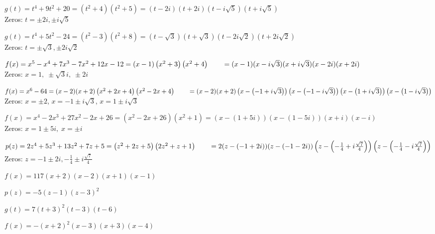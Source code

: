 \begin{exenum}
\item  $g(t) = t^4+9t^2+20 = \left(t^2+4\right) \left(t^2+5\right) = (t-2i)(t+2i)\left(t - i \sqrt{5}\right)\left(t + i \sqrt{5}\right)$\\
Zeros:  $t = \pm 2i, \pm i \sqrt{5}$
\item  $g(t) = t^4+5t^2-24 = \left(t^2-3 \right) \left(t^2+8\right) = (t-\sqrt{3})(t+\sqrt{3})\left(t - 2i \sqrt{2}\right)\left(t + 2i \sqrt{2}\right)$\\
Zeros:  $t = \pm \sqrt{3}, \pm 2i \sqrt{2}$

\item  $f(x) = x^5 - x^4+7x^3-7x^2+12x-12 = (x-1) \left(x^2 + 3\right) \left(x^2 + 4 \right) \\
\phantom{f(x)} = (x-1)(x - i \sqrt{3})(x + i \sqrt{3})(x-2i)(x+2i)$ \\
Zeros:  $x = 1, \;  \pm  \sqrt{3}i,  \; \pm 2i$
\item $f(x) = x^6 - 64 = (x-2)(x+2)\left(x^2+2x+4\right)\left(x^2-2x+4\right) \\
      \phantom{f(x)} = (x-2)(x+2)\left( x - \left( -1+i\sqrt{3} \right) \right)\left( x - \left( -1-i\sqrt{3} \right) \right)\left( x - \left( 1+i\sqrt{3} \right) \right)\left( x - \left( 1-i\sqrt{3} \right) \right)$ \\
Zeros:  $x = \pm 2$, $x = -1 \pm i\sqrt{3}$, $x = 1 \pm i\sqrt{3}$


\item $f(x) = x^{4} - 2x^{3} + 27x^{2} - 2x + 26 = (x^{2} - 2x + 26)(x^{2} + 1) = (x - (1 + 5i))(x - (1 - 5i))(x + i)(x - i)$\\ 
Zeros: $x = 1 \pm 5i, \; x = \pm i$
\item  $p(z) = 2z^4+5z^3+13z^2+7z+5 = \left(z^2+2z+5\right) \left(2z^2+z+1\right)  \\ \phantom{f(z)} = 2 (z-(-1+2i))(z-(-1-2i))\left(z - \left(-\frac{1}{4} + i \frac{\sqrt{7}}{4}\right) \right)\left(z - \left(-\frac{1}{4} - i \frac{\sqrt{7}}{4}\right) \right) $\\
Zeros:  $z = -1 \pm 2i, -\frac{1}{4} \pm i \frac{\sqrt{7}}{4}$

\item $f(x) = 117(x+2)(x-2)(x+1)(x-1)$

\item $p(z)= -5(z-1)(z-3)^2$

\item  $g(t) = 7(t+3)^2(t-3)(t-6)$

\item $f(x) = -(x + 2)^{2}(x - 3)(x + 3)(x - 4)$


\end{exenum}
